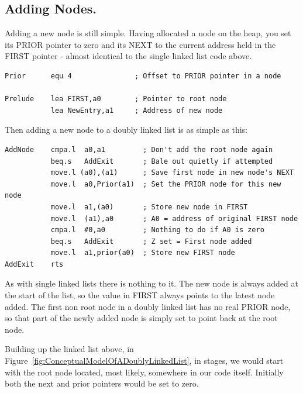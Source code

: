 \subsection{Adding Nodes.}
\label{ch10-dbl-adding-nodes}%

Adding a new node is still simple. Having allocated a node on the
      heap, you set its PRIOR pointer to zero and its NEXT to the current
      address held in the FIRST pointer -{} almost identical to the single
      linked list code above.

\begin{lstlisting}[firstnumber=1,caption={Adding a Node - Prelude},label={lst:AddingANodePrelude2}]
Prior      equ 4               ; Offset to PRIOR pointer in a node

Prelude    lea FIRST,a0        ; Pointer to root node
           lea NewEntry,a1     ; Address of new node
\end{lstlisting}

Then adding a new node to a doubly linked list is as simple as
      this:

\begin{lstlisting}[firstnumber=last,caption={Adding a Node},label={lst:AddingANode2}]
AddNode    cmpa.l  a0,a1         ; Don't add the root node again
           beq.s   AddExit       ; Bale out quietly if attempted
           move.l (a0),(a1)      ; Save first node in new node's NEXT 
           move.l  a0,Prior(a1)  ; Set the PRIOR node for this new node
           move.l  a1,(a0)       ; Store new node in FIRST 
           move.l  (a1),a0       ; A0 = address of original FIRST node
           cmpa.l  #0,a0         ; Nothing to do if A0 is zero
           beq.s   AddExit       ; Z set = First node added
           move.l  a1,prior(a0)  ; Store new FIRST node
AddExit    rts
\end{lstlisting}

As with single linked lists there is nothing to it. The new node
      is always added at the start of the list, so the value in FIRST always
      points to the latest node added. The first non root node in a doubly
      linked list has no real PRIOR node, so that part of the newly added node
      is simply set to point back at the root node.

Building up the linked list above, in Figure~\ref{fig:ConceptualModelOfADoublyLinkedList}, in stages, we would start with the root node located, most likely, somewhere in our code itself. Initially both the next and prior pointers would be set to zero.

